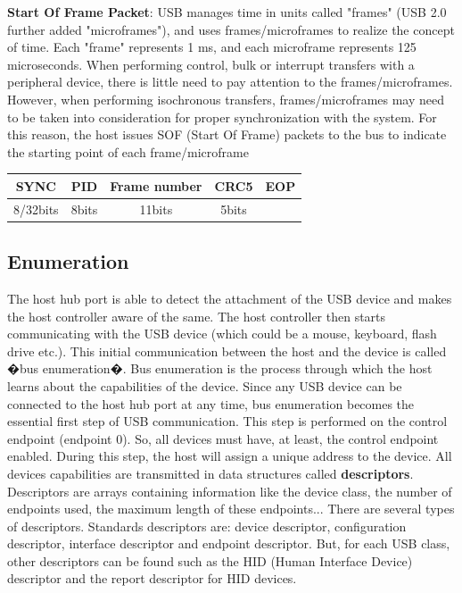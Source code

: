 \documentclass[pdftex,10pt,a4paper]{report}
\newenvironment{packed_item}{
\begin{itemize}
  \setlength{\itemsep}{1pt}
  \setlength{\parskip}{0pt}
  \setlength{\parsep}{0pt}
}{\end{itemize}}
\begin{document}
\begin{packed_item}
  	
	\item \textbf{Start Of Frame Packet}: USB manages time in units called "frames" (USB 2.0 further added "microframes"), and uses frames/microframes to realize the concept of time. Each "frame" represents 1 ms, and each microframe represents 125 microseconds. When performing control, bulk or interrupt transfers with a peripheral device, there is little need to pay attention to the frames/microframes. However, when performing isochronous transfers, frames/microframes may need to be taken into consideration for proper synchronization with the system. For this reason, the host issues SOF (Start Of Frame) packets to the bus to indicate the starting point of each frame/microframe
	
		\begin{center}
		\begin{tabular}{|c|c|c|c|c|}
  	\hline
  		SYNC & PID & Frame number & CRC5 & EOP \\ \hline
  		8/32bits & 8bits & 11bits & 5bits &   \\
  	\hline
  	\end{tabular}
  	\end{center}
  	
\end{packed_item}


\subsection{Enumeration}
The host hub port is able to detect the attachment of the USB device and makes the host controller aware of the same. The host controller then starts communicating with the USB device (which could be a mouse, keyboard, flash drive etc.). This initial communication between the host and the device is called �bus enumeration�. Bus enumeration is the process through which the host learns about the capabilities of the device. Since any USB device can be connected to the host hub port at any time, bus enumeration becomes the essential first step of USB communication. This step is performed on the control endpoint (endpoint 0). So, all devices must have, at least, the control endpoint enabled.
During this step, the host will assign a unique address to the device.
All devices capabilities are transmitted in data structures called \textbf{descriptors}. Descriptors are arrays containing information like the device class, the number of endpoints used, the maximum length of these endpoints... There are several types of descriptors. Standards descriptors are: device descriptor, configuration descriptor, interface descriptor and endpoint descriptor. But, for each USB class, other descriptors can be found such as the HID (Human Interface Device) descriptor and the report descriptor for HID devices.
\end{document}
